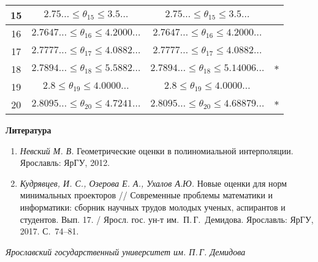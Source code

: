 \documentclass[14pt,a4paper]{extbook}
\begin{document}
\begin{center}
\begin{tabular}{|c|c|c|c|}
		15 & $2.75\ldots\leqslant\theta_{15}\leqslant3.5\dots$&  $2.75\ldots\leqslant\theta_{15}\leqslant3.5\dots$ & \\ \hline
		16 & $2.7647\ldots\leqslant\theta_{16}\leqslant4.2000\dots$ & $2.7647\ldots\leqslant\theta_{16}\leqslant4.2000\dots$ & \\ \hline
		17 &$2.7777\ldots\leqslant\theta_{17}\leqslant4.0882\dots$ &$2.7777\ldots\leqslant\theta_{17}\leqslant4.0882\dots$ &  \\ \hline
		18 & $2.7894\ldots\leqslant\theta_{18}\leqslant5.5882\dots$& $2.7894\ldots\leqslant\theta_{18}\leqslant5.14006\dots$ &  $*$\\ \hline
		19 &$2.8\leqslant\theta_{19}\leqslant4.0000\dots$ & $2.8\leqslant\theta_{19}\leqslant4.0000\dots$ & \\ \hline
		20 &$2.8095\ldots\leqslant\theta_{20}\leqslant4.7241\dots$ &$2.8095\ldots\leqslant\theta_{20}\leqslant4.68879\dots$ &  $*$ \\ \hline
	\end{tabular}
\end{center}


{\large\bf Литература}

\begin{enumerate}

\item 
{\it Невский М. В.} Геометрические оценки в полиномиальной
интерполяции. Ярославль: ЯрГУ, 2012.

\item 
{\it Кудрявцев, И. С., Озерова Е. А., Ухалов А.Ю.}
 Новые оценки для норм минимальных проекторов // Современные проблемы математики и информатики: сборник научных трудов молодых ученых, аспирантов и студентов. Вып. 17. / Яросл. гос. ун-т им.~П.\,Г.~Демидова. Ярославль: ЯрГУ, 2017. С.~74--81.
\end{enumerate}


\begin{flushright}
{\it Ярославский государственный университет им. П.\,Г. Демидова}
\end{flushright}
\end{document}
